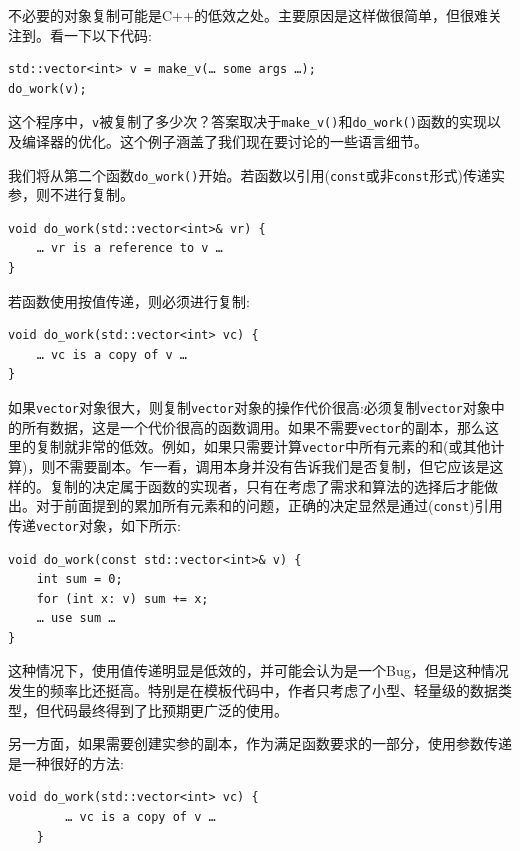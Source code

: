 不必要的对象复制可能是C++的低效之处。主要原因是这样做很简单，但很难关注到。看一下以下代码:

\begin{lstlisting}[style=styleCXX]
std::vector<int> v = make_v(… some args …);
do_work(v);
\end{lstlisting}

这个程序中，\texttt{v}被复制了多少次？答案取决于\texttt{make\_v()}和\texttt{do\_work()}函数的实现以及编译器的优化。这个例子涵盖了我们现在要讨论的一些语言细节。


我们将从第二个函数\texttt{do\_work()}开始。若函数以引用(\texttt{const}或非\texttt{const}形式)传递实参，则不进行复制。

\begin{lstlisting}[style=styleCXX]
void do_work(std::vector<int>& vr) {
	… vr is a reference to v …
}
\end{lstlisting}

若函数使用按值传递，则必须进行复制:

\begin{lstlisting}[style=styleCXX]
void do_work(std::vector<int> vc) {
	… vc is a copy of v …
}
\end{lstlisting}

如果\texttt{vector}对象很大，则复制\texttt{vector}对象的操作代价很高:必须复制\texttt{vector}对象中的所有数据，这是一个代价很高的函数调用。如果不需要\texttt{vector}的副本，那么这里的复制就非常的低效。例如，如果只需要计算\texttt{vector}中所有元素的和(或其他计算)，则不需要副本。乍一看，调用本身并没有告诉我们是否复制，但它应该是这样的。复制的决定属于函数的实现者，只有在考虑了需求和算法的选择后才能做出。对于前面提到的累加所有元素和的问题，正确的决定显然是通过(\texttt{const})引用传递\texttt{vector}对象，如下所示:

\begin{lstlisting}[style=styleCXX]
void do_work(const std::vector<int>& v) {
	int sum = 0;
	for (int x: v) sum += x;
	… use sum … 
}
\end{lstlisting}

这种情况下，使用值传递明显是低效的，并可能会认为是一个Bug，但是这种情况发生的频率比还挺高。特别是在模板代码中，作者只考虑了小型、轻量级的数据类型，但代码最终得到了比预期更广泛的使用。

另一方面，如果需要创建实参的副本，作为满足函数要求的一部分，使用参数传递是一种很好的方法:

\begin{lstlisting}[style=styleCXX]
	void do_work(std::vector<int> vc) {
		… vc is a copy of v …
	}
\end{lstlisting}

